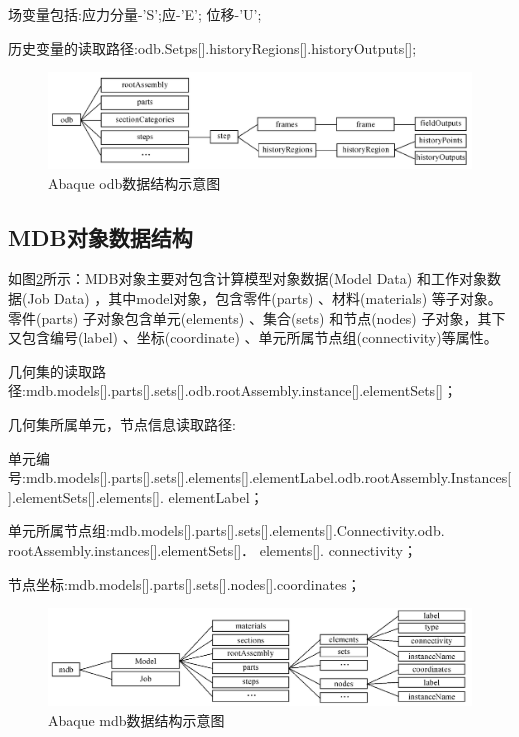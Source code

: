 \documentclass[forprint]{WHUBachelor}
\begin{document}
场变量包括:应力分量-'S';应-'E'; 位移-'U';

历史变量的读取路径:odb.Setps{[}{]}.historyRegions{[}{]}.historyOutputs{[}{]};

\begin{figure}[H]
\centering  
\includegraphics[width = .8\textwidth]{2.png} 
\caption{Abaque odb数据结构示意图} 
\label{4-2} 
\end{figure}

\subsection{MDB对象数据结构}

如图\ref{4-3}所示：MDB对象主要对包含计算模型对象数据(Model Data) 和工作对象数据(Job Data) ，其中model对象，包含零件(parts)
、材料(materials) 等子对象。零件(parts) 子对象包含单元(elements) 、集合(sets) 和节点(nodes)
子对象，其下又包含编号(label) 、坐标(coordinate) 、单元所属节点组(connectivity)等属性。

几何集的读取路径:mdb.models{[}{]}.parts{[}{]}.sets{[}{]}.odb.rootAssembly.instance{[}{]}.elementSets{[}{]}；

几何集所属单元，节点信息读取路径:

单元编号:mdb.models{[}{]}.parts{[}{]}.sets{[}{]}.elements{[}{]}.elementLabel.odb.rootAssembly.Instances{[}{]}.elementSets{[}{]}.elements{[}{]}.
elementLabel；

单元所属节点组:mdb.models{[}{]}.parts{[}{]}.sets{[}{]}.elements{[}{]}.Connectivity.odb.
rootAssembly.instances{[}{]}.elementSets{[}{]}． elements{[}{]}. connectivity；

节点坐标:mdb.models{[}{]}.parts{[}{]}.sets{[}{]}.nodes{[}{]}.coordinates；

\begin{figure}[H]
\centering  
\includegraphics[width = .8\textwidth]{3.png} 
\caption{Abaque mdb数据结构示意图} 
\label{4-3} 
\end{figure}
\end{document}
